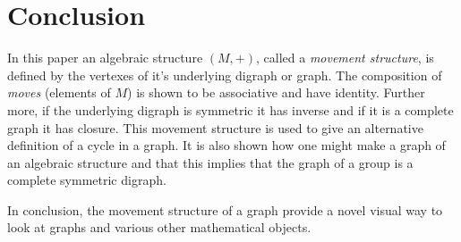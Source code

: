 \documentclass[a4paper,11pt]{article}
\theoremstyle{plain}
\theoremstyle{definition}
\begin{document}
\section{Conclusion}
In this paper an algebraic structure $(M,+)$, called a \textit{movement
structure}, is defined by the vertexes of it's underlying digraph or
graph. The composition of \textit{moves} (elements of $M$) is shown
to be associative and have identity. Further more, if the underlying
digraph is symmetric it has inverse and if it is a complete graph it has
closure. This movement structure is used to give an alternative definition
of a cycle in a graph. It is also shown how one might make a graph of
an algebraic structure and that this implies that the graph of a group
is a complete symmetric digraph. 

In conclusion, the movement structure of a graph provide a novel visual
way to look at graphs and various other mathematical objects.
\newpage
\end{document}
